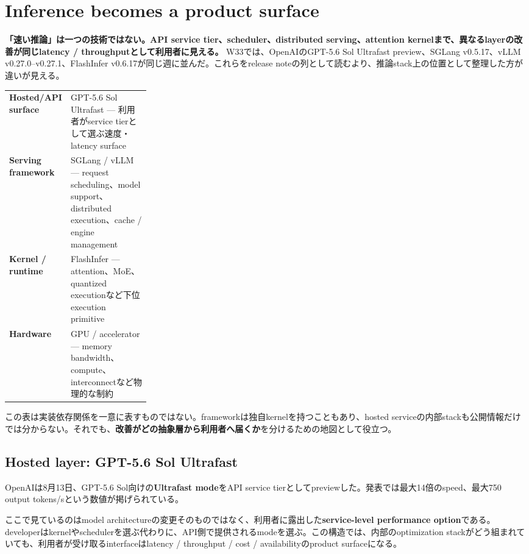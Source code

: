\section{Inference becomes a product surface}
\label{sec:inference-stack}

\textbf{「速い推論」は一つの技術ではない。API service tier、scheduler、distributed serving、attention kernelまで、異なるlayerの改善が同じlatency / throughputとして利用者に見える。}
W33では、OpenAIのGPT-5.6 Sol Ultrafast preview、SGLang v0.5.17、vLLM v0.27.0--v0.27.1、FlashInfer v0.6.17が同じ週に並んだ\cite{openai-ultrafast,sglang-0517-w33,vllm-0270,vllm-0271,flashinfer-0617}。これらをrelease noteの列として読むより、推論stack上の位置として整理した方が違いが見える。

\begin{center}
\small
\begin{tabularx}{0.97\linewidth}{@{}>{\bfseries}p{0.27\linewidth}X@{}}
Hosted/API surface & GPT-5.6 Sol Ultrafast --- 利用者がservice tierとして選ぶ速度・latency surface \\
Serving framework & SGLang / vLLM --- request scheduling、model support、distributed execution、cache / engine management \\
Kernel / runtime & FlashInfer --- attention、MoE、quantized executionなど下位execution primitive \\
Hardware & GPU / accelerator --- memory bandwidth、compute、interconnectなど物理的な制約 \\
\end{tabularx}
\end{center}

この表は実装依存関係を一意に表すものではない。frameworkは独自kernelを持つこともあり、hosted serviceの内部stackも公開情報だけでは分からない。それでも、\textbf{改善がどの抽象層から利用者へ届くか}を分けるための地図として役立つ。

\subsection*{Hosted layer: GPT-5.6 Sol Ultrafast}

OpenAIは8月13日、GPT-5.6 Sol向けの\textbf{Ultrafast mode}をAPI service tierとしてpreviewした\cite{openai-ultrafast}。発表では最大14倍のspeed、最大750 output tokens/sという数値が掲げられている。

ここで見ているのはmodel architectureの変更そのものではなく、利用者に露出した\textbf{service-level performance option}である。developerはkernelやschedulerを選ぶ代わりに、API側で提供されるmodeを選ぶ。この構造では、内部のoptimization stackがどう組まれていても、利用者が受け取るinterfaceはlatency / throughput / cost / availabilityのproduct surfaceになる。

